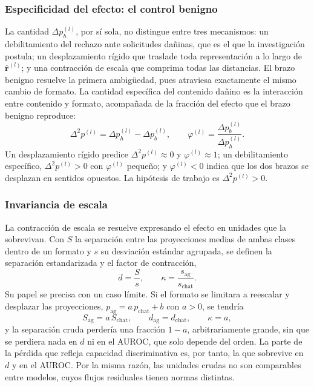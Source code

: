 \subsubsection*{Especificidad del efecto: el control benigno}

La cantidad $\Delta p_{h}^{(l)}$, por sí sola, no distingue entre tres mecanismos: un debilitamiento del rechazo ante solicitudes dañinas, que es el que la investigación postula; un desplazamiento rígido que traslade toda representación a lo largo de $\hat{\bm{r}}^{(l)}$; y una contracción de escala que comprima todas las distancias. El brazo benigno resuelve la primera ambigüedad, pues atraviesa exactamente el mismo cambio de formato. La cantidad específica del contenido dañino es la interacción entre contenido y formato, acompañada de la fracción del efecto que el brazo benigno reproduce:
\begin{equation}
\Delta^{2} p^{(l)} = \Delta p_{h}^{(l)} - \Delta p_{b}^{(l)},
\qquad
\varphi^{(l)} = \frac{\Delta p_{b}^{(l)}}{\Delta p_{h}^{(l)}}.
\label{eq:interaccion}
\end{equation}
Un desplazamiento rígido predice $\Delta^{2} p^{(l)} \approx 0$ y $\varphi^{(l)} \approx 1$; un debilitamiento específico, $\Delta^{2} p^{(l)} > 0$ con $\varphi^{(l)}$ pequeño; y $\varphi^{(l)} < 0$ indica que los dos brazos se desplazan en sentidos opuestos. La hipótesis de trabajo es $\Delta^{2} p^{(l)} > 0$.

\subsubsection*{Invariancia de escala}

La contracción de escala se resuelve expresando el efecto en unidades que la sobrevivan. Con $S$ la separación entre las proyecciones medias de ambas clases dentro de un formato y $s$ su desviación estándar agrupada, se definen la separación estandarizada y el factor de contracción,
\begin{equation}
d = \frac{S}{s},
\qquad
\kappa = \frac{s_{\text{ag}}}{s_{\text{chat}}}.
\label{eq:kappa}
\end{equation}
Su papel se precisa con un caso límite. Si el formato se limitara a reescalar y desplazar las proyecciones, $p_{\text{ag}} = a\, p_{\text{chat}} + b$ con $a > 0$, se tendría
\begin{equation}
S_{\text{ag}} = a\, S_{\text{chat}},
\qquad
d_{\text{ag}} = d_{\text{chat}},
\qquad
\kappa = a,
\label{eq:caso-afin}
\end{equation}
y la separación cruda perdería una fracción $1 - a$, arbitrariamente grande, sin que se perdiera nada en $d$ ni en el AUROC, que solo depende del orden. La parte de la pérdida que refleja capacidad discriminativa es, por tanto, la que sobrevive en $d$ y en el AUROC. Por la misma razón, las unidades crudas no son comparables entre modelos, cuyos flujos residuales tienen normas distintas.

